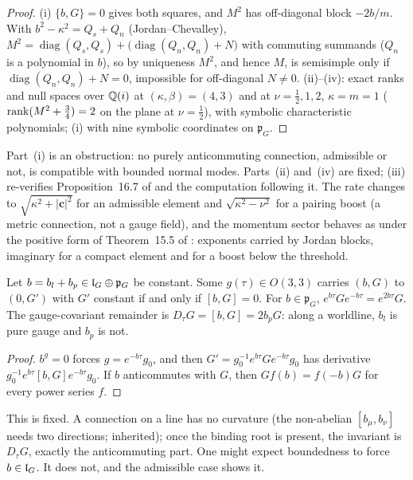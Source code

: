 \begin{proof}
(i) $\{b,G\}=0$ gives both squares, and $M^2$ has off-diagonal block $-2b/m$. With $b^2-\kappa^2=Q_s+Q_n$ (Jordan--Chevalley),
$M^2=\operatorname{diag}(Q_s,Q_s)+\bigl(\operatorname{diag}(Q_n,Q_n)+N\bigr)$ with commuting summands ($Q_n$ is a polynomial in $b$), so by uniqueness $M^2$, and
hence $M$, is semisimple only if $\operatorname{diag}(Q_n,Q_n)+N=0$, impossible for off-diagonal $N\neq0$. (ii)--(iv): exact ranks and null spaces over
$\mathbb{Q}(i)$ at $(\kappa,\beta)=(4,3)$ and at $\nu=\tfrac12,1,2$, $\kappa=m=1$ ($\operatorname{rank}(M^2+\tfrac34)=2$ on the plane at $\nu=\tfrac12$), with symbolic
characteristic polynomials; (i) with nine symbolic coordinates on $\mathfrak p_G$.
\end{proof}

Part~(i) is an obstruction: no purely anticommuting connection, admissible or not, is compatible with bounded normal modes. Parts~(ii)
and~(iv) are fixed; (iii) re-verifies Proposition~16.7 of \cite{ES17} and the computation following it. The rate changes to
$\sqrt{\kappa^2+|\mathbf c|^2}$ for an admissible element and $\sqrt{\kappa^2-\nu^2}$ for a pairing boost (a metric connection, not a gauge field), and
the momentum sector behaves as under the positive form of Theorem~15.5 of \cite{ES17}: exponents carried by Jordan blocks, imaginary for a
compact element and for a boost below the threshold.

\begin{proposition}
\label{d4:prop:remove}
Let $b=b_l+b_p\in\mathfrak l_G\oplus\mathfrak p_G$ be constant. Some $g(\tau)\in O(3,3)$ carries $(b,G)$ to $(0,G')$ with $G'$ constant if and only if $[b,G]=0$. For
$b\in\mathfrak p_G$, $e^{b\tau}Ge^{-b\tau}=e^{2b\tau}G$. The gauge-covariant remainder is $D_\tau G=[b,G]=2b_pG$: along a worldline, $b_l$ is pure gauge
and $b_p$ is not.
\end{proposition}

\begin{proof}
$b^g=0$ forces $g=e^{-b\tau}g_0$, and then $G'=g_0^{-1}e^{b\tau}Ge^{-b\tau}g_0$ has derivative $g_0^{-1}e^{b\tau}[b,G]e^{-b\tau}g_0$. If $b$ anticommutes
with $G$, then $Gf(b)=f(-b)G$ for every power series $f$.
\end{proof}

This is fixed. A connection on a line has no curvature (the non-abelian $[b_\mu,b_\nu]$ needs two directions; inherited); once the binding root
is present, the invariant is $D_\tau G$, exactly the anticommuting part. One might expect boundedness to force $b\in\mathfrak l_G$. It does not, and the
admissible case shows it.

